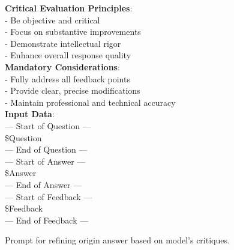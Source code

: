 \documentclass[11pt, a4paper, logo, copyright, nonumbering, amsart]{map}
\begin{document}
\begin{CJK*}{UTF8}{gbsn}
\begin{figure*}[h!]
\begin{center}
\begin{tcolorbox}[width=0.6\textwidth, colback=lightblue, title={\textbf{Prompt for Refining Origin Answer Based on Model's Critiques}}]
    \textbf{Critical Evaluation Principles}:\\
    - Be objective and critical\\
    - Focus on substantive improvements\\
    - Demonstrate intellectual rigor\\
    - Enhance overall response quality\\
    
    \textbf{Mandatory Considerations}:\\
    - Fully address all feedback points\\
    - Provide clear, precise modifications\\
    - Maintain professional and technical accuracy\\
    
    \textbf{Input Data}:\\
    --- Start of Question ---\\
    \textcolor{ora}{\$Question}\\
    --- End of Question ---\\
    
    --- Start of Answer ---\\
    \textcolor{ora}{\$Answer}\\
    --- End of Answer ---\\
    
    --- Start of Feedback ---\\  
    \textcolor{ora}{\$Feedback}\\
    --- End of Feedback ---\\

    \end{tcolorbox}
\end{center}
\caption{Prompt for refining origin answer based on model's critiques.} \label{ap:prompt_refine}
\end{figure*}

\end{CJK*}
\end{document}
